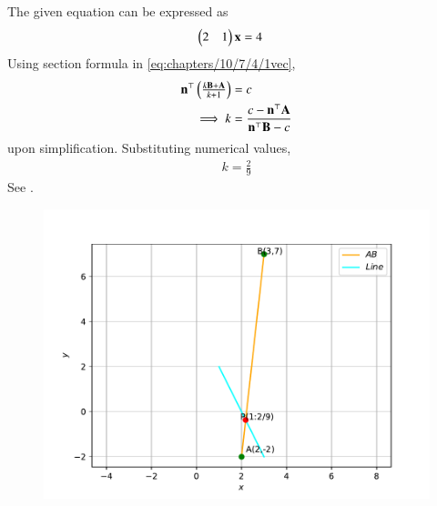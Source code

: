 The given equation can be expressed as
\begin{align}
\label{eq:chapters/10/7/4/1vec}
    \begin{pmatrix}2&1\end{pmatrix}\mathbf{x}&=4
\end{align}
Using section formula in
\eqref{eq:chapters/10/7/4/1vec},
\begin{align}
    \mathbf{n}^{\top}\begin{pmatrix}\frac{k\mathbf{B+A}}{k+1}\end{pmatrix}&=c\\
    \implies k&=\frac{c-\mathbf{n}^{\top}\mathbf{A}}{\mathbf{n}^{\top}\mathbf{B}-c}
\end{align}
upon simplification.  Substituting numerical values, 
\begin{align}
    k=\frac{2}{9}
\end{align}
See 
.
\begin{figure}[!h]
\centering
\includegraphics[width=\columnwidth]{chapters/10/7/4/1/figs/vec.pdf}
\caption{}
\label{fig:chapters/10/7/4/1vec}
\end{figure}

